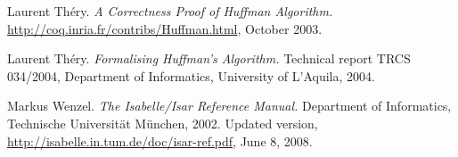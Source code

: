 \documentclass[11pt,a4paper]{article}
\begin{document}
\begin{thebibliography}{[9]}
 Laurent Th\'ery. {\sl A Correctness Proof of Huffman
Algorithm.} \url{http://coq.inria.fr/contribs/Huffman.html}, October 2003.

 Laurent Th\'ery. {\sl Formalising Huffman's Algorithm.}
Technical report TRCS 034/2004, Department of Informatics, University of
L'Aquila, 2004.

 Markus Wenzel. {\sl The Isabelle/Isar Reference Manual.}
Department of Informatics, Technische Universit\"at M\"unchen, 2002. Updated
version, \url{http://isabelle.in.tum.de/doc/isar-ref.pdf}, June 8, 2008.

\end{thebibliography}
\end{document}
